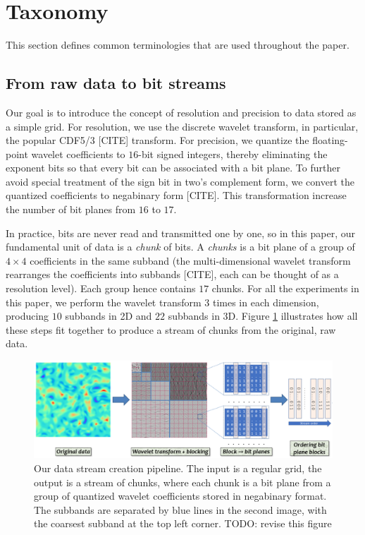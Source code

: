 \section{Taxonomy}
\label{sec:terminologies}

This section defines common terminologies that are used throughout the paper.

\subsection{From raw data to bit streams}

Our goal is to introduce the concept of resolution and precision to data stored as a simple grid.
For resolution, we use the discrete wavelet transform, in particular, the popular CDF5/3 [CITE]
transform. For precision, we quantize the floating-point wavelet coefficients to $16$-bit signed
integers, thereby eliminating the exponent bits so that every bit can be associated with a bit
plane. To further avoid special treatment of the sign bit in two's complement form, we convert the
quantized coefficients to negabinary form [CITE]. This transformation increase the number of bit
planes from $16$ to $17$.

In practice, bits are never read and transmitted one by one, so in this paper, our fundamental unit
of data is a \emph{chunk} of bits. A \emph{chunks} is a bit plane of a group of $4\times 4$
coefficients in the same subband (the multi-dimensional wavelet transform rearranges the
coefficients into subbands [CITE], each can be thought of as a resolution level). Each group hence
contains $17$ chunks. For all the experiments in this paper, we perform the wavelet transform $3$
times in each dimension, producing $10$ subbands in 2D and $22$ subbands in 3D. Figure
\ref{fig:pipeline} illustrates how all these steps fit together to produce a stream of chunks from
the original, raw data.

\begin{figure}
  \centering
  \includegraphics[width=\linewidth]{img/pipeline.png}
  \caption{Our data stream creation pipeline. The input is a regular grid, the output is a stream of
  chunks, where each chunk is a bit plane from a group of quantized wavelet coefficients stored in
  negabinary format. The subbands are separated by blue lines in the second image, with the coarsest
  subband at the top left corner. TODO: revise this figure}
  \label{fig:pipeline}
\end{figure}

